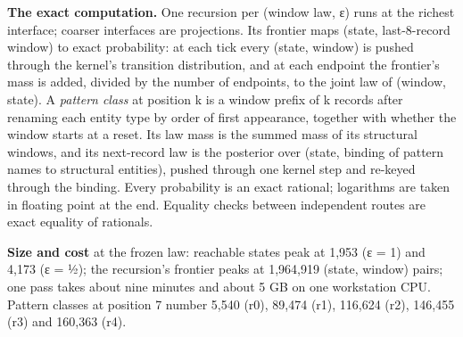 \documentclass[10pt]{article}
\begin{document}
\textbf{The exact computation.} One recursion per (window law, ε) runs at the richest interface; coarser interfaces are
projections. Its frontier maps (state, last-8-record window) to exact probability: at each tick every (state, window)
is pushed through the kernel's transition distribution, and at each endpoint the frontier's mass is added, divided by
the number of endpoints, to the joint law of (window, state). A \emph{pattern class} at position k is a window prefix of k
records after renaming each entity type by order of first appearance, together with whether the window starts at a
reset. Its law mass is the summed mass of its structural windows, and its next-record law is the posterior over
(state, binding of pattern names to structural entities), pushed through one kernel step and re-keyed through the
binding. Every probability is an exact rational; logarithms are taken in floating point at the end. Equality checks
between independent routes are exact equality of rationals.

\textbf{Size and cost} at the frozen law: reachable states peak at 1,953 (ε = 1) and 4,173 (ε = ½); the recursion's frontier
peaks at 1,964,919 (state, window) pairs; one pass takes about nine minutes and about 5 GB on one workstation CPU.
Pattern classes at position 7 number 5,540 (r0), 89,474 (r1), 116,624 (r2), 146,455 (r3) and 160,363 (r4).
\end{document}
